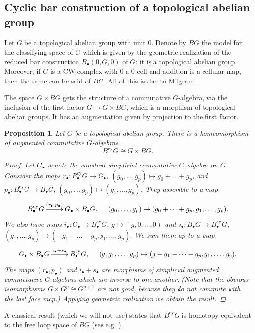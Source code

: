 \documentclass[a4paper,11pt]{amsart} %
\theoremstyle{definition} \newtheorem{defn}[equation]{Definition}
\theoremstyle{remark} \newtheorem{notation}[equation]{Notation}
\theoremstyle{plain} \newtheorem{teo}[equation]{Theorem}
\theoremstyle{plain} \newtheorem{lema}[equation]{Lemma}
\theoremstyle{plain} \newtheorem{prop}[equation]{Proposition}
\theoremstyle{plain} \newtheorem{corolario}[equation]{Corollary}
\theoremstyle{remark} \newtheorem{obs}[equation]{Remark}
\theoremstyle{remark} \newtheorem{sideobs}[equation]{Side remark}
\theoremstyle{remark} \newtheorem{ejercicio}[equation]{Exercise}
\theoremstyle{definition} \newtheorem{notn}[equation]{Notation}
\theoremstyle{remark} \newtheorem{ej}[equation]{Example}
\theoremstyle{remark} \newtheorem{contraej}[equation]{Counterexample}
\theoremstyle{plain} \newtheorem{conj}[equation]{Conjecture}
\renewcommand{\1}{\ensuremath{\mathbbm{1}}}
\newcommand{\bprop}{\begin{prop}}
\newcommand{\eprop}{\end{prop}}
\newcommand{\bprf}{\begin{proof}}
\newcommand{\eprf}{\end{proof}}
\newcommand{\cy}{\mathrm{cy}}
\numberwithin{equation}{section}
\begin{document}
\subsection{Cyclic bar construction of a topological abelian group}  \label{section:cyclictop}
Let $G$ be a topological abelian group with unit $0$. %
Denote by $BG$ the model for the classifying space of $G$ which is given by the geometric realization of the reduced bar construction $B_\bullet(0,G,0)$ of $G$: it is a topological abelian group. Moreover, if $G$ is a CW-complex with $0$ a 0-cell and addition is a cellular map, then the same can be said of $BG$. All of this is due to Milgram \cite{milgram}. %

The space $G\times BG$ gets the structure of a commutative $G$-algebra, via the inclusion of the first factor $G\to G\times BG$, which is a morphism of topological abelian groups. It has an augmentation given by projection to the first factor.

%
%
\bprop \label{BcyG} Let $G$ be a topological abelian group. There is a homeomorphism of augmented commutative $G$-algebras
\[B^\cy G \cong G \times BG.\]
\bprf %
Let $G_\bullet$ denote the constant simplicial commutative $G$-algebra on $G$. Consider the maps $r_\bullet:B^\cy_\bullet G \to G_\bullet$, $(g_0,\dots,g_p)\mapsto g_0+\dots+g_p$, and $p_\bullet:B^\cy_\bullet G \to B_\bullet G$, $(g_0,\dots,g_p)\mapsto (g_1,\dots,g_p)$. They assemble to a map
\[\xymatrix{B^\cy_\bullet G \ar[r]^-{(r_\bullet, p_\bullet)} & G_\bullet \times B_\bullet G, \hspace{.5cm} (g_0,\dots,g_p)\mapsto (g_0+\dots+g_p,g_1,\dots,g_p).}\]
We also have maps $i_\bullet:G_\bullet \to B_\bullet^\cy G$, $g\mapsto (g,0,\dots,0)$ and $s_\bullet:B_\bullet G \to B^\cy_\bullet G$, $(g_1,\dots,g_p)\mapsto (-g_1-\dots-g_p,g_1,\dots,g_p)$. We sum them up to a map
\[\xymatrix{ G_\bullet \times B_\bullet G \ar[r]^-{i_\bullet+s_\bullet} & B_\bullet^\cy G, \hspace{.5cm} (g,g_1,\dots,g_p)\mapsto (g-g_1-\dots-g_p,g_1,\dots,g_p).}\]
The maps $(r_\bullet,p_\bullet)$ and $i_\bullet+s_\bullet$ are morphisms of simplicial augmented commutative $G$-algebras which are inverse to one another. (Note that the obvious isomorphisms $G\times G^p \cong G^{p+1}$ are not good, because they do not commute with the last face map.) Applying geometric realization we obtain the result.
%
%
%
%
%
%
%
%
%
%
\eprf
\eprop




A classical result (which we will not use) states that $B^\cy G$ is homotopy equivalent to the free loop space of $BG$ (see e.g. \cite[Section 2]{bhm}).
\end{document}
